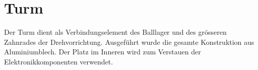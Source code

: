 \section{Turm}
Der Turm dient als Verbindungselement des Balllager und des grösseren Zahnrades der Drehvorrichtung. Ausgeführt wurde die gesamte Konstruktion aus Aluminiumblech. Der Platz im Inneren wird zum Verstauen der Elektronikkomponenten verwendet.